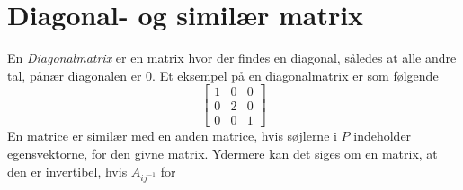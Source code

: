\section{Diagonal- og similær matrix}
En \textit{Diagonalmatrix} er en matrix hvor der findes en diagonal, således at alle andre tal, pånær diagonalen er 0.
Et eksempel på en diagonalmatrix er som følgende
\begin{equation}
\left[
    \begin{matrix}
        1&0&0\\
        0&2&0\\
        0&0&1
    \end{matrix}
\right]
\end{equation}
En matrice er similær med en anden matrice, hvis søjlerne i $P$ indeholder egensvektorne, for den givne matrix.
Ydermere kan det siges om en matrix, at den er invertibel, hvis $A_{ij^{-1}}$ for 